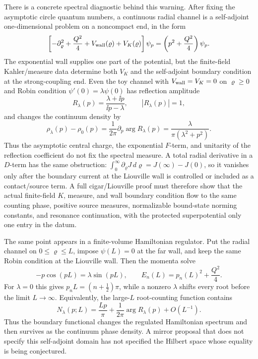 There is a concrete spectral diagnostic behind this warning.  After fixing the
asymptotic circle quantum numbers, a continuous radial channel is a
self-adjoint one-dimensional problem on a noncompact end, in the form
\[
  \left[
    -\partial_\varrho^2
    +\frac{Q^2}{4}
    +V_{\rm wall}(\varrho)
    +V_{K}(\varrho)
  \right]\psi_p
  =
  \left(p^2+\frac{Q^2}{4}\right)\psi_p .
\]
The exponential wall supplies one part of the potential, but the finite-field
Kahler/measure data determine both \(V_K\) and the self-adjoint boundary
condition at the strong-coupling end.  Even the toy channel with
\(V_{\rm wall}=V_K=0\) on \(\varrho\ge0\) and Robin condition
\(\psi'(0)=\lambda\psi(0)\) has reflection amplitude
\[
  R_\lambda(p)
  =
  \frac{\lambda+\ii p}{\ii p-\lambda},
  \qquad
  |R_\lambda(p)|=1,
\]
and changes the continuum density by
\[
  \rho_\lambda(p)-\rho_0(p)
  =
  \frac1{2\pi}\partial_p\arg R_\lambda(p)
  =
  \frac{\lambda}{\pi(\lambda^2+p^2)} .
\]
Thus the asymptotic central charge, the exponential \(F\)-term, and unitarity
of the reflection coefficient do not fix the spectral measure.  A total
radial derivative in a \(D\)-term has the same obstruction:
\(\int_0^\infty \partial_\varrho J\,d\varrho=J(\infty)-J(0)\), so it vanishes
only after the boundary current at the Liouville wall is controlled or included
as a contact/source term.  A full cigar/Liouville proof must therefore show
that the actual finite-field \(K\), measure, and wall boundary condition flow
to the same counting phase, positive source measures, normalizable bound-state
norming constants, and resonance continuation, with the protected
superpotential only one entry in the datum.

The same point appears in a finite-volume Hamiltonian regulator.  Put the
radial channel on \(0\le\varrho\le L\), impose
\(\psi(L)=0\) at the far wall, and keep the same Robin condition at the
Liouville wall.  Then the momenta solve
\begin{equation}
  -p\cos(pL)=\lambda\sin(pL),
  \qquad
  E_n(L)=p_n(L)^2+\frac{Q^2}{4}.
  \label{eq:liouville-robin-finite-volume-quantization}
\end{equation}
For \(\lambda=0\) this gives \(p_nL=(n+\tfrac12)\pi\), while a nonzero
\(\lambda\) shifts every root before the limit \(L\to\infty\).  Equivalently,
the large-\(L\) root-counting function contains
\[
  N_\lambda(p;L)
  =
  \frac{Lp}{\pi}
  +\frac1{2\pi}\arg R_\lambda(p)+O(L^{-1}).
\]
Thus the boundary functional changes the regulated Hamiltonian spectrum and
then survives as the continuum phase density.  A mirror proposal that does not
specify this self-adjoint domain has not specified the Hilbert space whose
equality is being conjectured.

